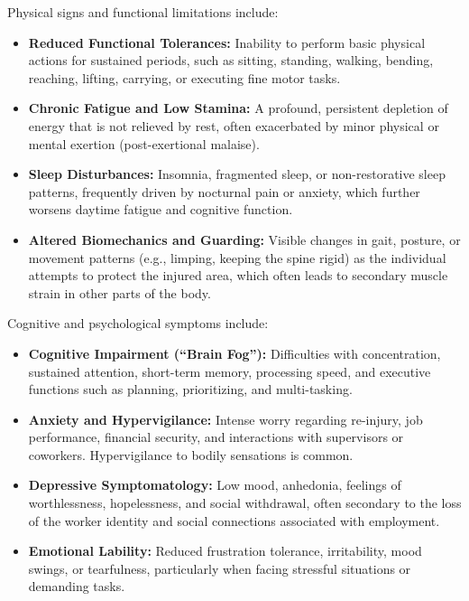 Physical signs and functional limitations include:
\begin{itemize}
    \item \textbf{Reduced Functional Tolerances:} Inability to perform basic physical actions for sustained periods, such as sitting, standing, walking, bending, reaching, lifting, carrying, or executing fine motor tasks.
    \item \textbf{Chronic Fatigue and Low Stamina:} A profound, persistent depletion of energy that is not relieved by rest, often exacerbated by minor physical or mental exertion (post-exertional malaise).
    \item \textbf{Sleep Disturbances:} Insomnia, fragmented sleep, or non-restorative sleep patterns, frequently driven by nocturnal pain or anxiety, which further worsens daytime fatigue and cognitive function.
    \item \textbf{Altered Biomechanics and Guarding:} Visible changes in gait, posture, or movement patterns (e.g., limping, keeping the spine rigid) as the individual attempts to protect the injured area, which often leads to secondary muscle strain in other parts of the body.
\end{itemize}

Cognitive and psychological symptoms include:
\begin{itemize}
    \item \textbf{Cognitive Impairment (``Brain Fog''):} Difficulties with concentration, sustained attention, short-term memory, processing speed, and executive functions such as planning, prioritizing, and multi-tasking.
    \item \textbf{Anxiety and Hypervigilance:} Intense worry regarding re-injury, job performance, financial security, and interactions with supervisors or coworkers. Hypervigilance to bodily sensations is common.
    \item \textbf{Depressive Symptomatology:} Low mood, anhedonia, feelings of worthlessness, hopelessness, and social withdrawal, often secondary to the loss of the worker identity and social connections associated with employment.
    \item \textbf{Emotional Lability:} Reduced frustration tolerance, irritability, mood swings, or tearfulness, particularly when facing stressful situations or demanding tasks.
\end{itemize}

